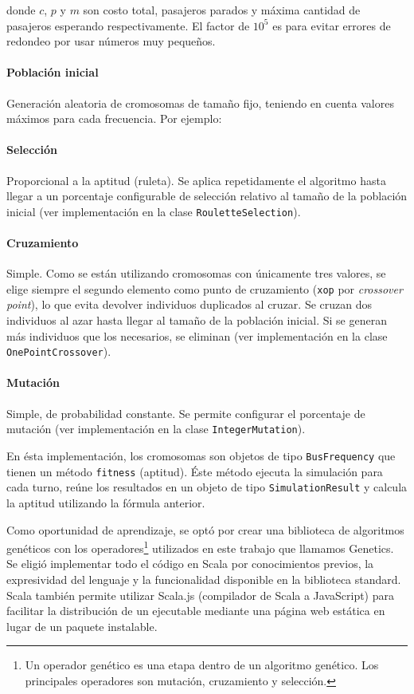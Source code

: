 \documentclass{conaiisi}
\begin{document}
\begin{multicols}{2}
donde $c$, $p$ y $m$ son costo total, pasajeros parados y máxima cantidad de pasajeros esperando respectivamente.
El factor de $10^5$ es para evitar errores de redondeo por usar números muy pequeños.


\paragraph{Población inicial} Generación aleatoria de cromosomas de tamaño fijo, teniendo en cuenta valores máximos para cada frecuencia.
Por ejemplo:



\paragraph{Selección} Proporcional a la aptitud (ruleta). Se aplica repetidamente el algoritmo hasta llegar a un porcentaje configurable de selección relativo al tamaño de la población inicial (ver implementación en la clase \texttt{RouletteSelection}).

\paragraph{Cruzamiento} Simple.
Como se están utilizando cromosomas con únicamente tres valores, se elige siempre el segundo elemento como punto de cruzamiento (\texttt{xop} por \textit{\foreignlanguage{english}{crossover point}}), lo que evita devolver individuos duplicados al cruzar.
Se cruzan dos individuos al azar hasta llegar al tamaño de la población inicial.
Si se generan más individuos que los necesarios, se eliminan (ver implementación en la clase \texttt{OnePointCrossover}).

\paragraph{Mutación} Simple, de probabilidad constante. Se permite configurar el porcentaje de mutación (ver implementación en la clase \texttt{IntegerMutation}).

En ésta implementación, los cromosomas son objetos de tipo \texttt{BusFrequency} que tienen un método \texttt{fitness} (aptitud).
Éste método ejecuta la simulación para cada turno, reúne los resultados en un objeto de tipo \texttt{SimulationResult} y calcula la aptitud utilizando la fórmula anterior.

Como oportunidad de aprendizaje, se optó por crear una biblioteca de algoritmos genéticos con los operadores\footnote{Un operador genético es una etapa dentro de un algoritmo genético. Los principales operadores son mutación, cruzamiento y selección.} utilizados en este trabajo que llamamos Genetics\cite{genetics}.
Se eligió implementar todo el código en Scala por conocimientos previos, la expresividad del lenguaje y la funcionalidad disponible en la biblioteca standard.
Scala también permite utilizar Scala.js\cite{scalajs} (compilador de Scala a JavaScript) para facilitar la distribución de un ejecutable mediante una página web estática en lugar de un paquete instalable.


\end{multicols}
\end{document}
